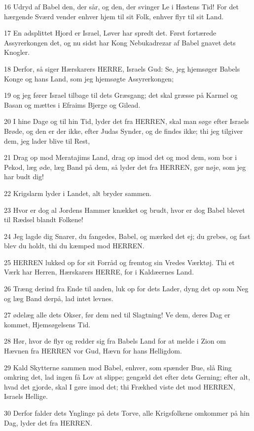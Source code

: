 \par 16 Udryd af Babel den, der sår, og den, der svinger Le i Høstens Tid! For det hærgende Sværd vender enhver hjem til sit Folk, enhver flyr til sit Land.
\par 17 En adsplittet Hjord er Israel, Løver har spredt det. Først fortærede Assyrerkongen det, og nu sidst har Kong Nebukadrezar af Babel gnavet dets Knogler.
\par 18 Derfor, så siger Hærskarers HERRE, Israels Gud: Se, jeg hjemsøger Babels Konge og hans Land, som jeg hjemsøgte Assyrerkongen;
\par 19 og jeg fører Israel tilbage til dets Græsgang; det skal græsse på Karmel og Basan og mættes i Efraims Bjerge og Gilead.
\par 20 I hine Dage og til hin Tid, lyder det fra HERREN, skal man søge efter Israels Brøde, og den er der ikke, efter Judas Synder, og de findes ikke; thi jeg tilgiver dem, jeg lader blive til Rest,
\par 21 Drag op mod Meratajims Land, drag op imod det og mod dem, som bor i Pekod, læg øde, læg Band på dem, så lyder det fra HERREN, gør nøje, som jeg har budt dig!
\par 22 Krigslarm lyder i Landet, alt bryder sammen.
\par 23 Hvor er dog al Jordens Hammer knækket og brudt, hvor er dog Babel blevet til Rædsel blandt Folkene!
\par 24 Jeg lagde dig Snarer, du fangedes, Babel, og mærked det ej; du grebes, og fast blev du holdt, thi du kæmped mod HERREN.
\par 25 HERREN lukked op for sit Forråd og fremtog sin Vredes Værktøj. Thi et Værk har Herren, Hærskarers HERRE, for i Kaldæernes Land.
\par 26 Træng derind fra Ende til anden, luk op for dets Lader, dyng det op som Neg og læg Band derpå, lad intet levnes.
\par 27 ødelæg alle dets Okser, før dem ned til Slagtning! Ve dem, deres Dag er kommet, Hjemsøgelsens Tid.
\par 28 Hør, hvor de flyr og redder sig fra Babels Land for at melde i Zion om Hævnen fra HERREN vor Gud, Hævn for hans Helligdom.
\par 29 Kald Skytterne sammen mod Babel, enhver, som spænder Bue, slå Ring omkring det, lad ingen få Lov at slippe; gengæld det efter dets Gerning; efter alt, hvad det gjorde, skal I gøre imod det; thi Frækhed viste det mod HERREN, Israels Hellige.
\par 30 Derfor falder dets Ynglinge på dets Torve, alle Krigsfolkene omkommer på hin Dag, lyder det fra HERREN.
